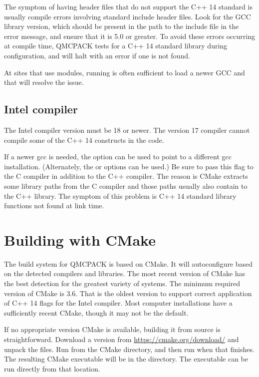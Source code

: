 The symptom of having header files that do not support the C++ 14 standard is usually
compile errors involving standard include header files.
Look for the GCC library version, which should be present in the path to the include file in the error message, and ensure that it is 5.0 or greater.
To avoid these errors occurring at compile time, QMCPACK tests for a C++ 14 standard
library during configuration, and will halt with an error if one is not found.

At sites that use modules, running  is often sufficient to
load a newer GCC and that will resolve the issue.

\subsection{Intel compiler}
The Intel compiler version must be 18 or newer.
The version 17 compiler cannot compile some of the C++ 14 constructs in the code.

If a newer gcc is needed, the  option can be used to point to a different gcc installation.
(Alternately, the  or  options can be used.)
Be sure to pass this flag to the C compiler in addition to the C++ compiler.
The reason is CMake extracts some library paths from the C compiler and those paths usually also contain to the C++ library.
The symptom of this problem is C++ 14 standard library functions not found at link time.

\section{Building with CMake}
\label{sec:cmake}
The build system for QMCPACK is based on CMake.  It will autoconfigure
based on the detected compilers and libraries. The most recent
version of CMake has the best detection for the greatest variety of
systems.  The minimum required version of CMake is 3.6.  That is the
oldest version to support correct application of C++ 14 flags for the Intel compiler.
Most computer installations have a sufficiently recent CMake, though it may not be
the default.

If no appropriate version CMake is available, building it from source is straightforward.
Download a version from \url{https://cmake.org/download/} and unpack the files.
Run  from the CMake directory, and then run 
when that finishes.  The resulting CMake executable will be in the  directory.
The executable can be run directly from that location.

